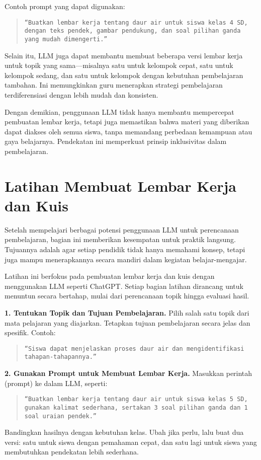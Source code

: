 Contoh prompt yang dapat digunakan:
\begin{quote}
	\centering
	\texttt{“Buatkan lembar kerja tentang daur air untuk siswa kelas 4 SD, dengan teks pendek, gambar pendukung, dan soal pilihan ganda yang mudah dimengerti.”}
\end{quote}

Selain itu, LLM juga dapat membantu membuat beberapa versi lembar kerja untuk topik yang sama—misalnya satu untuk kelompok cepat, satu untuk kelompok sedang, dan satu untuk kelompok dengan kebutuhan pembelajaran tambahan. Ini memungkinkan guru menerapkan strategi pembelajaran terdiferensiasi dengan lebih mudah dan konsisten.

Dengan demikian, penggunaan LLM tidak hanya membantu mempercepat pembuatan lembar kerja, tetapi juga memastikan bahwa materi yang diberikan dapat diakses oleh semua siswa, tanpa memandang perbedaan kemampuan atau gaya belajarnya. Pendekatan ini memperkuat prinsip inklusivitas dalam pembelajaran.


\section{Latihan Membuat Lembar Kerja dan Kuis}

Setelah mempelajari berbagai potensi penggunaan LLM untuk perencanaan pembelajaran, bagian ini memberikan kesempatan untuk praktik langsung. Tujuannya adalah agar setiap pendidik tidak hanya memahami konsep, tetapi juga mampu menerapkannya secara mandiri dalam kegiatan belajar-mengajar.

Latihan ini berfokus pada pembuatan lembar kerja dan kuis dengan menggunakan LLM seperti ChatGPT. Setiap bagian latihan dirancang untuk menuntun secara bertahap, mulai dari perencanaan topik hingga evaluasi hasil.

\textbf{1. Tentukan Topik dan Tujuan Pembelajaran.}  
Pilih salah satu topik dari mata pelajaran yang diajarkan. Tetapkan tujuan pembelajaran secara jelas dan spesifik. Contoh:
\begin{quote}
	\centering
	\texttt{“Siswa dapat menjelaskan proses daur air dan mengidentifikasi tahapan-tahapannya.”}
\end{quote}

\textbf{2. Gunakan Prompt untuk Membuat Lembar Kerja.}  
Masukkan perintah (prompt) ke dalam LLM, seperti:
\begin{quote}
	\centering
	\texttt{“Buatkan lembar kerja tentang daur air untuk siswa kelas 5 SD, gunakan kalimat sederhana, sertakan 3 soal pilihan ganda dan 1 soal uraian pendek.”}
\end{quote}
Bandingkan hasilnya dengan kebutuhan kelas. Ubah jika perlu, lalu buat dua versi: satu untuk siswa dengan pemahaman cepat, dan satu lagi untuk siswa yang membutuhkan pendekatan lebih sederhana.

